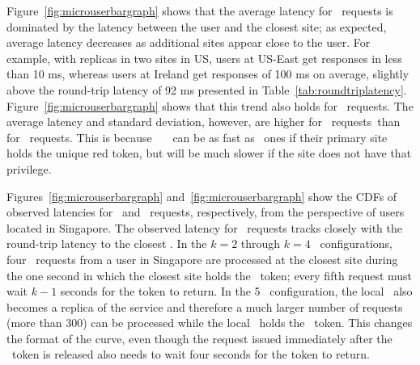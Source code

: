 Figure~\ref{fig:microuserbargraph} shows that the average
  latency for \blue\ requests is dominated by the latency between the
  user and the closest site; as expected, average latency decreases as
  additional sites appear close to the user. For example, with replicas in two sites in US, 
  users at US-East get responses in less than 10 ms, whereas users at 
  Ireland get responses of 100 ms on average, slightly above the round-trip latency of 92 ms presented
  in Table~\ref{tab:roundtriplatency}.
  Figure~\ref{fig:microuserbargraph} shows that this trend 
  also holds for \red\ requests. The average latency and standard deviation,
  however, are higher for \red\ requests\ than for \blue\ requests. This
is because \red\ \shadow\ \operations\ can be as fast as \blue\ ones if
their primary site holds the unique red token, but will be much slower if
the site does not have that privilege.
  
Figures~\ref{fig:microuserbargraph} and~\ref{fig:microuserbargraph} show the CDFs
  of observed latencies for \blue\ and \red\ requests, respectively,
  from the perspective of users located in Singapore.  The observed
  latency for \blue\ requests tracks closely with the round-trip
  latency to the closest \dc.  In the $k=2$ through $k=4$ \dc\ configurations,
  four \red\ requests from a user in Singapore are processed at the
  closest site during the one second in which the closest site holds
  the \red\ token; every fifth request must wait $k-1$ seconds for
  the token to return.  In the 5 \dc\ configuration, the local
  \dc\ also becomes a replica of the service and therefore
  a much larger number of requests (more than 300) can be processed
  while the local \dc\ holds the \red\ token.
  This changes the format of the curve, even though the
request issued immediately after the \red\ token is
released also needs to wait four seconds for the token to return.

